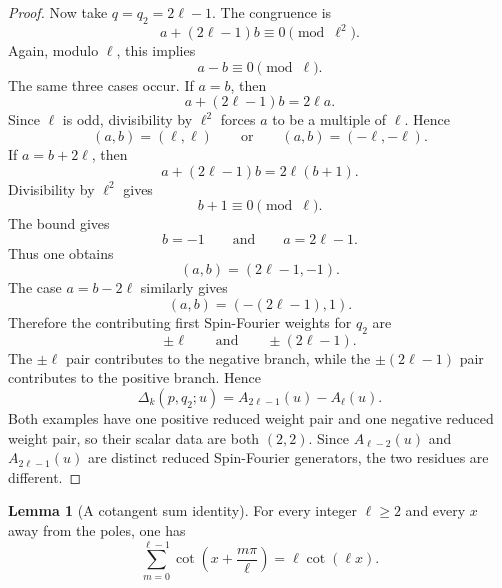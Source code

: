 \documentclass{article}
\theoremstyle{definition}
\newtheorem{lemma}[theorem]{Lemma}
\numberwithin{equation}{section}
\begin{document}
\begin{proof}
Now take $q=q_2=2\ell-1$.  The congruence is
\begin{equation}
a+(2\ell-1)b\equiv0\pmod{\ell^2}.
\end{equation}
Again, modulo $\ell$, this implies
\begin{equation}
a-b\equiv0\pmod{\ell}.
\end{equation}
The same three cases occur.  If $a=b$, then
\begin{equation}
a+(2\ell-1)b=2\ell a.
\end{equation}
Since $\ell$ is odd, divisibility by $\ell^2$ forces $a$ to be a multiple of $\ell$.  Hence
\begin{equation}
(a,b)=(\ell,\ell)
\qquad\text{or}\qquad
(a,b)=(-\ell,-\ell).
\end{equation}
If $a=b+2\ell$, then
\begin{equation}
a+(2\ell-1)b=2\ell(b+1).
\end{equation}
Divisibility by $\ell^2$ gives
\begin{equation}
b+1\equiv0\pmod{\ell}.
\end{equation}
The bound gives
\begin{equation}
b=-1
\qquad\text{and}\qquad
a=2\ell-1.
\end{equation}
Thus one obtains
\begin{equation}
(a,b)=(2\ell-1,-1).
\end{equation}
The case $a=b-2\ell$ similarly gives
\begin{equation}
(a,b)=(-(2\ell-1),1).
\end{equation}
Therefore the contributing first Spin-Fourier weights for $q_2$ are
\begin{equation}
\pm\ell
\qquad\text{and}\qquad
\pm(2\ell-1).
\end{equation}
The $\pm\ell$ pair contributes to the negative branch, while the $\pm(2\ell-1)$ pair contributes to the positive branch.  Hence
\begin{equation}
\Delta_k(p,q_2;u)=A_{2\ell-1}(u)-A_{\ell}(u).
\end{equation}
Both examples have one positive reduced weight pair and one negative reduced weight pair, so their scalar data are both $(2,2)$.  Since $A_{\ell-2}(u)$ and $A_{2\ell-1}(u)$ are distinct reduced Spin-Fourier generators, the two residues are different.
\end{proof}

\begin{lemma}[A cotangent sum identity]
\label{lem:cotangent-sum-identity}
For every integer $\ell\geq2$ and every $x$ away from the poles, one has
\begin{equation}
\sum_{m=0}^{\ell-1}\cot\left(x+\frac{m\pi}{\ell}\right)
=
\ell\cot(\ell x).
\end{equation}
\end{lemma}
\end{document}
